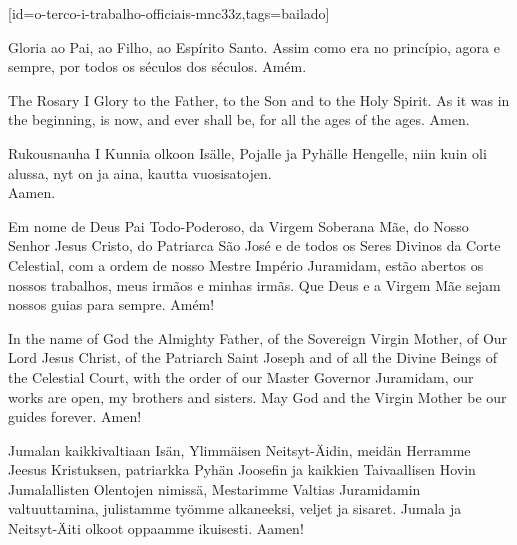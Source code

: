 [id={o-terco-i-trabalho-officiais-mnc33z},tags={bailado}]
  \begin{passage}[PT]{}
    Gloria ao Pai, ao Filho, ao Espírito Santo.
    Assim como era no princípio, agora e sempre,
    por todos os séculos dos séculos. Amém.
  \end{passage}
  \begin{passage}[EN]{The Rosary I}
    Glory to the Father, to the Son and to the Holy Spirit.
    As it was in the beginning, is now, and ever shall be,
    for all the ages of the ages. Amen.
  \end{passage}
  \begin{passage}[FI]{Rukousnauha I}
    Kunnia olkoon Isälle, Pojalle ja Pyhälle Hengelle,
    niin kuin oli alussa, nyt on ja aina,
    kautta vuosisatojen.\\
    Aamen.
  \end{passage}
\endsong


\begin{intersong}
  \begin{passage}[PT]{}
    Em nome de Deus Pai Todo-Poderoso, da Virgem Soberana Mãe,
    do Nosso Senhor Jesus Cristo, do Patriarca São José e de
    todos os Seres Divinos da Corte Celestial, com a ordem de
    nosso Mestre Império Juramidam, estão abertos os nossos
    trabalhos, meus irmãos e minhas irmãs. Que Deus e a Virgem Mãe
    sejam nossos guias para sempre. Amém!
  \end{passage}
  \begin{passage}[EN]{ }%
    In the name of God the Almighty Father, of the Sovereign Virgin
    Mother, of Our Lord Jesus Christ, of the Patriarch Saint Joseph and of
    all the Divine Beings of the Celestial Court, with the order of our Master
    Governor Juramidam, our works are open, my brothers and sisters.
    May God and the Virgin Mother be our guides forever. Amen!
  \end{passage}
  \begin{passage}[FI]{ }%
    Jumalan kaikkivaltiaan Isän, Ylimmäisen Neitsyt-Äidin,
    meidän Herramme Jeesus Kristuksen, patriarkka Pyhän Joosefin ja
    kaikkien Taivaallisen Hovin Jumalallisten Olentojen nimissä,
    Mestarimme Valtias Juramidamin valtuuttamina, julistamme työmme alkaneeksi,
    veljet ja sisaret. Jumala ja Neitsyt-Äiti olkoot oppaamme ikuisesti. Aamen!
  \end{passage}
  \vfill
\end{intersong}


